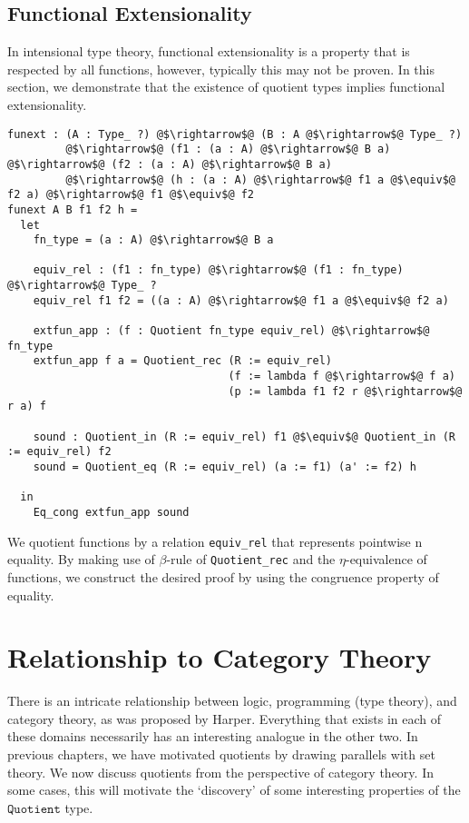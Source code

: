 \documentclass[12pt,twoside,maitrise]{dms}
\theoremstyle{definition}
\numberwithin{equation}{section}
\numberwithin{table}{chapter}
\numberwithin{figure}{chapter}
\newcommand\id[1] {\texttt{#1}}
\begin{document}
\section{Functional Extensionality}\label{sec:quot-implies-funext}

In intensional type theory, functional extensionality is a property that is
respected by all functions, however, typically this may not be proven. In this
section, we demonstrate that the existence of quotient types implies functional
extensionality.

\begin{verbatim}
funext : (A : Type_ ?) @$\rightarrow$@ (B : A @$\rightarrow$@ Type_ ?)
         @$\rightarrow$@ (f1 : (a : A) @$\rightarrow$@ B a) @$\rightarrow$@ (f2 : (a : A) @$\rightarrow$@ B a)
         @$\rightarrow$@ (h : (a : A) @$\rightarrow$@ f1 a @$\equiv$@ f2 a) @$\rightarrow$@ f1 @$\equiv$@ f2
funext A B f1 f2 h =
  let
    fn_type = (a : A) @$\rightarrow$@ B a

    equiv_rel : (f1 : fn_type) @$\rightarrow$@ (f1 : fn_type) @$\rightarrow$@ Type_ ?
    equiv_rel f1 f2 = ((a : A) @$\rightarrow$@ f1 a @$\equiv$@ f2 a)

    extfun_app : (f : Quotient fn_type equiv_rel) @$\rightarrow$@ fn_type
    extfun_app f a = Quotient_rec (R := equiv_rel)
                                  (f := lambda f @$\rightarrow$@ f a)
                                  (p := lambda f1 f2 r @$\rightarrow$@ r a) f

    sound : Quotient_in (R := equiv_rel) f1 @$\equiv$@ Quotient_in (R := equiv_rel) f2
    sound = Quotient_eq (R := equiv_rel) (a := f1) (a' := f2) h

  in
    Eq_cong extfun_app sound
\end{verbatim}

We quotient functions by a relation \id{equiv\_rel} that represents pointwise
n
equality. By making use of $\beta$-rule of \id{Quotient\_rec} and the
$\eta$-equivalence of functions, we construct the desired proof by using the
congruence property of equality.

\chapter{Relationship to Category Theory}
There is an intricate relationship between logic, programming (type theory), and
category theory, as was proposed by Harper\cite{harpertrinity}. Everything that
exists in each of these domains necessarily has an interesting analogue in the
other two. In previous chapters, we have motivated quotients by drawing
parallels with set theory. We now discuss quotients from the perspective of
category theory. In some cases, this will motivate the `discovery' of some
interesting properties of the $\id{Quotient}$ type.
\end{document}

